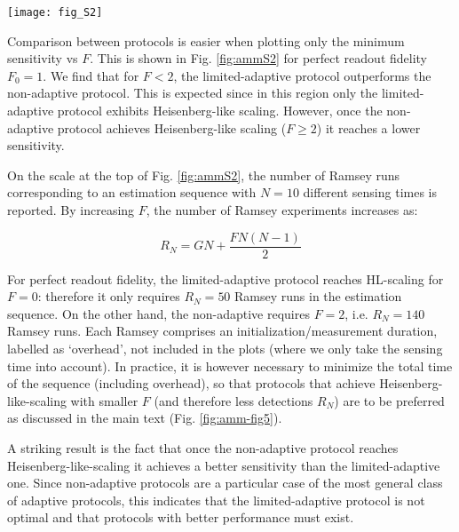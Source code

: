 \begin{figure*}
	\centering
	\texttt{[image: fig\_S2]}
	\caption{\label{fig:ammS2} \textbf{Simulation results for the best achieved sensitivity, comparing the limited-adaptive and non-adaptive protocols as a function of F}. Here, we assume perfect readout fidelity ($F_0=1$) and $T_2^* = 5\mu$s. On the top x-axis, the total number of Ramsey experiments in the estimation sequence for $N = 10$ is reported. Error bars, corresponding to one standard deviation, are calculated by bootstrap.
	}
\end{figure*}

Comparison between protocols is easier when plotting only the minimum sensitivity vs $F$. This is shown in Fig. \ref{fig:ammS2} for perfect readout fidelity $F_0=1$. We find that for $F<2$, the limited-adaptive protocol outperforms the non-adaptive protocol. This is expected since in this region only the limited-adaptive protocol exhibits Heisenberg-like scaling. However, once the non-adaptive protocol achieves Heisenberg-like scaling ($F\geq2$) it reaches a lower sensitivity.

On the scale at the top of Fig. \ref{fig:ammS2}, the number of Ramsey runs corresponding to an estimation sequence with $N = 10$ different sensing times is reported. By increasing $F$, the number of Ramsey experiments increases as:

\begin{equation}
R_N = GN + \frac{FN(N-1)}{2}
\end{equation}

For perfect readout fidelity, the limited-adaptive protocol reaches HL-scaling for $F=0$: therefore it only requires $R_N = 50$ Ramsey runs in the estimation sequence. On the other hand, the non-adaptive requires $F=2$, i.e. $R_N = 140$ Ramsey runs. Each Ramsey comprises an initialization/measurement duration, labelled as `overhead', not included in the plots (where we only take the sensing time into account). In practice, it is however necessary to minimize the total time of the sequence (including overhead), so that protocols that achieve Heisenberg-like-scaling with smaller $F$ (and therefore less detections $R_N$) are to be preferred as discussed in the main text (Fig. \ref{fig:amm-fig5}).


A striking result is the fact that once the non-adaptive protocol reaches Heisenberg-like-scaling it achieves a better sensitivity than the limited-adaptive one. Since non-adaptive protocols are a particular case of the most general class of adaptive protocols, this indicates that the limited-adaptive protocol is not optimal and that protocols with better performance must exist.

